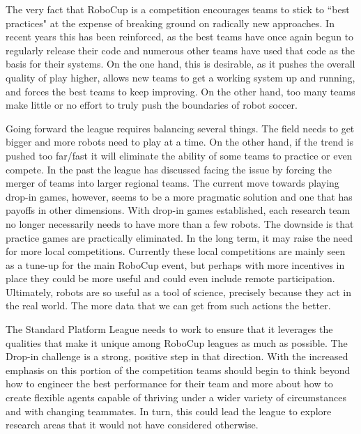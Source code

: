 \documentclass{llncs}
\begin{document}
The very fact that RoboCup is a competition
encourages teams to stick to ``best practices" at the expense of breaking ground on
radically new approaches. In recent years this has been reinforced, as the best teams
have once again begun to regularly release their code and numerous other teams have
used that code as the basis for their systems. On the one hand, this is desirable,
as it pushes the overall quality of play higher, allows new teams to get a working
system up and running, and forces the best teams to keep improving. On the other
hand, too many teams make little or no effort to truly push the boundaries of robot
soccer. 

Going forward the league requires balancing several things. The field
needs to get bigger and more robots need to play at a time. On the other hand, if the
trend is pushed too far/fast it will eliminate the ability of some teams to practice or
even compete. In the past the league has discussed facing the issue by forcing the
merger of teams into larger regional teams. The current move towards playing drop-in
games, however, seems to be a more pragmatic solution and one that has payoffs
in other dimensions. With drop-in games established, each research team no longer necessarily needs to have more
than a few robots. The downside is that practice games are practically eliminated. In the long term, it may raise 
the need for more local competitions. Currently these local competitions
are mainly seen as a tune-up for the main RoboCup event, but perhaps with more incentives in place
they could be more useful and could even include remote participation. Ultimately,
robots are so useful as a tool of science, precisely because they act in the real world. The
more data that we can get from such actions the better.

The Standard Platform League 
needs to work to ensure that it leverages the qualities that make it unique among RoboCup leagues as much
as possible. The Drop-in challenge is a strong, positive step in that direction. With the
increased emphasis on this portion of the competition teams should begin to think beyond
how to engineer the best performance for their team and more about how to create flexible
agents capable of thriving under a wider variety of circumstances and with changing
teammates. In turn, this could lead the league to explore research areas that it would not have considered
otherwise. 
\end{document}
